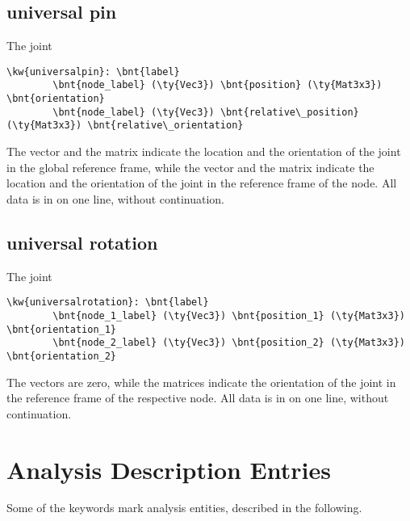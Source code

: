 \subsection{universal pin}
The  joint
\begin{Verbatim}[commandchars=\\\{\}]
    \kw{universalpin}: \bnt{label}
        \bnt{node_label} (\ty{Vec3}) \bnt{position} (\ty{Mat3x3}) \bnt{orientation}
        \bnt{node_label} (\ty{Vec3}) \bnt{relative\_position} (\ty{Mat3x3}) \bnt{relative\_orientation}
\end{Verbatim}
The  vector and the  matrix indicate 
the location and the orientation of the joint in the global reference frame, 
while the  vector
and the  matrix indicate
the location and the orientation of the joint
in the reference frame of the node.
All data is in on one line, without continuation.

\subsection{universal rotation}
The  joint
\begin{Verbatim}[commandchars=\\\{\}]
    \kw{universalrotation}: \bnt{label}
        \bnt{node_1_label} (\ty{Vec3}) \bnt{position_1} (\ty{Mat3x3}) \bnt{orientation_1}
        \bnt{node_2_label} (\ty{Vec3}) \bnt{position_2} (\ty{Mat3x3}) \bnt{orientation_2}
\end{Verbatim}
The  vectors are zero,
while the  matrices indicate the orientation of the joint
in the reference frame of the respective node.
All data is in on one line, without continuation.


\section{Analysis Description Entries}
Some of the keywords mark analysis entities, described in the following.

